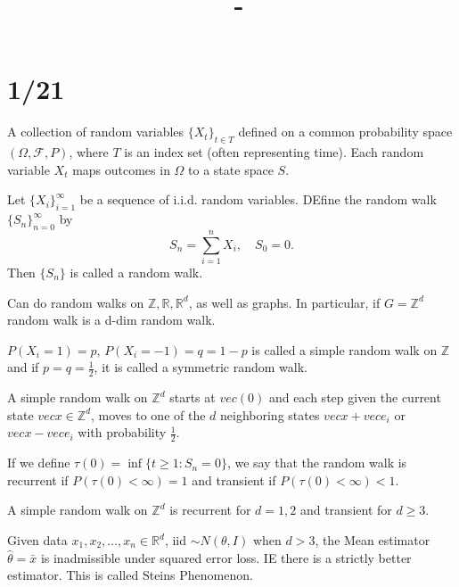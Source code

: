 \documentclass[answers,12pt,addpoints]{exam}
\author{\name}
\title{\course \ - \assignment}
\begin{document}
\maketitle

\newpage
\tableofcontents
\newpage
\section{1/21}
\begin{definition}
    A collection of random variables $\{X_t\}_{t \in T}$ defined on a common probability space $(\Omega, \mathcal{F}, P)$, where $T$ is an index set (often representing time). Each random variable $X_t$ maps outcomes in $\Omega$ to a state space $S$.
\end{definition}
\begin{definition}
    Let $\{X_i\}_{i=1}^{\infty}$ be a sequence of i.i.d. random variables. DEfine the random walk $\{S_n\}_{n=0}^{\infty}$ by
    \[
        S_n = \sum_{i=1}^{n} X_i, \quad S_0 = 0.
    \]
    Then $\{S_n\}$ is called a random walk.

    Can do random walks on $\mathbb{Z}, \mathbb{R}, \mathbb{R}^d$, as well as graphs. In particular, if $G = \mathbb{Z}^d$ random walk is a d-dim random walk.

    $P(X_i = 1) = p$, $P(X_i = -1) = q = 1-p$ is called a simple random walk on $\mathbb{Z}$ and if $p = q = \frac{1}{2}$, it is called a symmetric random walk.
\end{definition}
\begin{example}
    A simple random walk on $\mathbb{Z}^d$ starts at $vec(0)$ and each step given the current state $vec{x} \in \mathbb{Z}^d$, moves to one of the $d$ neighboring states $vec{x} + vec{e_i}$ or $vec{x} - vec{e_i}$ with probability $\frac{1}{2}$. 

    If we define $\tau(0) = \inf\{t \geq 1: S_n = 0\}$, we say that the random walk is recurrent if $P(\tau(0) < \infty) = 1$ and transient if $P(\tau(0) < \infty) < 1$.
\end{example}
\begin{theorem}
    A simple random walk on $\mathbb{Z}^d$ is recurrent for $d = 1, 2$ and transient for $d \geq 3$.
\end{theorem}
\begin{note}
    Given data $x_1, x_2, \ldots, x_n \in \mathbb{R}^d$, iid $\sim N(\theta, I)$ when $d > 3$, the Mean estimator $\hat{\theta} = \bar{x}$ is inadmissible under squared error loss. IE there is a strictly better estimator. This is called Steins Phenomenon.
\end{note}
\end{document}
